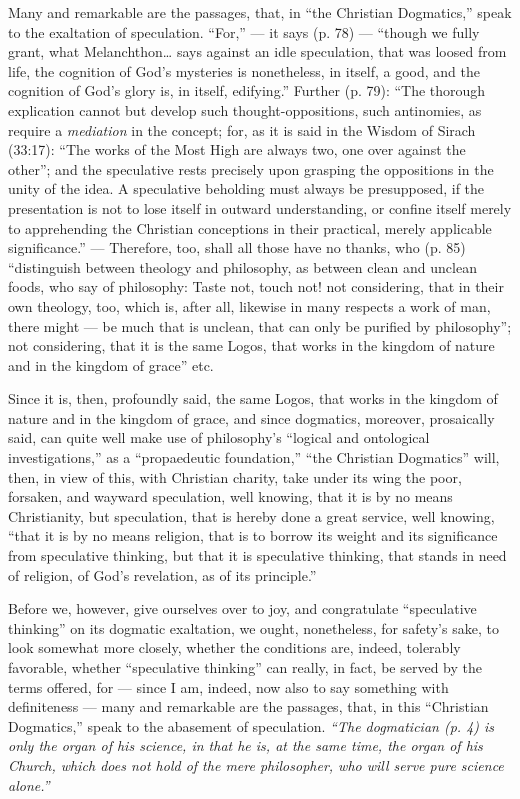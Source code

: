 \documentclass[12pt]{book}
\begin{document}
Many and remarkable are the passages, that, in ``the Christian Dogmatics,'' speak to the exaltation of speculation. ``For,'' --- it says (p. 78) --- ``though we fully grant, what Melanchthon\ldots{} says against an idle speculation, that was loosed from life, the cognition of God's mysteries is nonetheless, in itself, a good, and the cognition of God's glory is, in itself, edifying.'' Further (p. 79): ``The thorough explication cannot but develop such thought-oppositions, such antinomies, as require a \emph{mediation} in the concept; for, as it is said in the Wisdom of Sirach (33:17): ``The works of the Most High are always two, one over against the other''; and the speculative rests precisely upon grasping the oppositions in the unity of the idea. A speculative beholding must always be presupposed, if the presentation is not to lose itself in outward understanding, or confine itself merely to apprehending the Christian conceptions in their practical, merely applicable significance.'' --- Therefore, too, shall all those have no thanks, who (p. 85) ``distinguish between theology and philosophy, as between clean and unclean foods, who say of philosophy: Taste
not, touch not! not considering, that in their own theology, too, which is, after all, likewise in many respects a work of man, there might --- be much that is unclean, that can only be purified by philosophy''; not considering, that it is the same Logos, that works in the kingdom of nature and in the kingdom of grace'' etc.

Since it is, then, profoundly said, the same Logos, that works in the kingdom of nature and in the kingdom of grace, and since dogmatics, moreover, prosaically said, can quite well make use of philosophy's ``logical and ontological investigations,'' as a ``propaedeutic foundation,'' ``the Christian Dogmatics'' will, then, in view of this, with Christian charity, take under its wing the poor, forsaken, and wayward speculation, well knowing, that it is by no means
Christianity, but speculation, that is hereby done a great service, well knowing, ``that it is by no means religion, that is to borrow its weight and its significance from speculative thinking, but that it is speculative thinking, that stands in need of religion, of God's revelation, as of its principle.''

Before we, however, give ourselves over to joy, and congratulate ``speculative thinking'' on its dogmatic exaltation, we ought, nonetheless, for safety's sake, to look somewhat more closely, whether the conditions are, indeed, tolerably favorable, whether ``speculative thinking'' can really, in fact, be served by the terms offered, for --- since I am, indeed, now also to say something with definiteness --- many and remarkable are the passages, that, in this ``Christian Dogmatics,'' speak to the abasement of speculation.
\emph{``The dogmatician (p. 4) is only the organ of his science, in that he is, at the same time, the organ of his Church, which does not hold of the mere philosopher, who will serve pure science alone.''}
\end{document}
